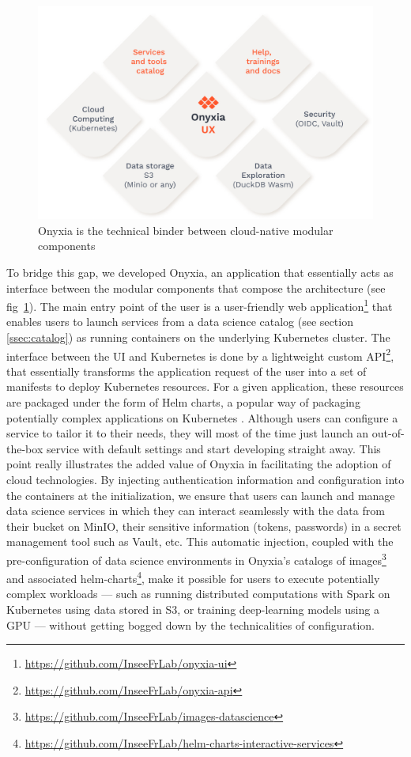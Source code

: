 \documentclass[graybox]{svmult}
\begin{document}
\begin{figure}[htbp]
    \centering
    \includegraphics[width=\linewidth]{figures/onyxia-components.png}
    \caption{Onyxia is the technical binder between cloud-native modular components}
    \label{fig:onyxia-components}
\end{figure}

To bridge this gap, we developed Onyxia, an application that essentially acts as interface between the modular components that compose the architecture (see fig~\ref{fig:onyxia-components}). The main entry point of the user is a user-friendly web application\footnote{\url{https://github.com/InseeFrLab/onyxia-ui}} that enables users to launch services from a data science catalog (see section \ref{ssec:catalog}) as running containers on the underlying Kubernetes cluster. The interface between the UI and Kubernetes is done by a lightweight custom API\footnote{\url{https://github.com/InseeFrLab/onyxia-api}}, that essentially transforms the application request of the user into a set of manifests to deploy Kubernetes resources. For a given application, these resources are packaged under the form of Helm charts, a popular way of packaging potentially complex applications on Kubernetes \cite{gokhale2021creating}. Although users can configure a service to tailor it to their needs, they will most of the time just launch an out-of-the-box service with default settings and start developing straight away. This point really illustrates the added value of Onyxia in facilitating the adoption of cloud technologies. By injecting authentication information and configuration into the containers at the initialization, we ensure that users can launch and manage data science services in which they can interact seamlessly with the data from their bucket on MinIO, their sensitive information (tokens, passwords) in a secret management tool such as Vault, etc. This automatic injection, coupled with the pre-configuration of data science environments in Onyxia's catalogs of images\footnote{\url{https://github.com/InseeFrLab/images-datascience}} and associated helm-charts\footnote{\url{https://github.com/InseeFrLab/helm-charts-interactive-services}}, make it possible for users to execute potentially complex workloads — such as running distributed computations with Spark on Kubernetes using data stored in S3, or training deep-learning models using a GPU — without getting bogged down by the technicalities of configuration.
\end{document}
